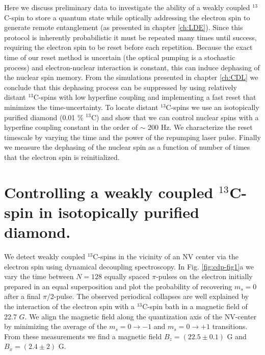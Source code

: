 Here we discuss preliminary data to investigate the ability of a weakly coupled $^{13}$C-spin to store a quantum state while optically addressing the electron spin to generate remote entanglement (as presented in chapter \ref{ch:LDE}). Since this protocol \cite{Barrett_Phys.Rev.A_2005,Bernien_Nature_2013} is inherently probabilistic it must be repeated many times until success, requiring the electron spin to be reset before each repetition. Because the exact time of our reset method is uncertain (the optical pumping is a stochastic process) and electron-nuclear interaction is constant, this can induce dephasing of the nuclear spin memory. From the simulations presented in chapter \ref{ch:CDL} we conclude that this dephasing process can be suppressed by using relatively distant $^{13}$C-spins with low hyperfine coupling and implementing a fast reset that minimizes the time-uncertainty. To locate distant $^{13}$C-spins we use an isotopically purified diamond (0.01 $\%$ $^{13}$C) and show that we can control nuclear spins with a hyperfine coupling constant in the order of $\sim$ 200 Hz. We characterize the reset timescale by varying the time and the power of the repumping laser pulse. Finally we measure the dephasing of the nuclear spin as a function of number of times that the electron spin is reinitialized.

\section{Controlling a weakly coupled $^{13}$C-spin in isotopically purified diamond.}

We detect weakly coupled $^{13}$C-spins in the vicinity of an NV center via the electron spin using dynamical decoupling spectroscopy\cite{Taminiau_Phys.Rev.Lett._2012,Zhao_NatNano_2012,Kolkowitz_Phys.Rev.Lett._2012}. In Fig. \ref{fig:cdp-fig1}a we vary the time between $N = 128$ equally spaced $\pi$-pulses on the electron initially prepared in an equal superposition and plot the probability of recovering $m_s = 0$ after a final $\pi$/2-pulse. The observed periodical collapses\cite{Childress_Science_2006} are well explained by the interaction of the electron spin with a $^{13}$C-spin bath in a magnetic field of 22.7 $G$. We align the magnetic field along the quantization axis of the NV-center by minimizing the average of the $m_s = 0 \rightarrow -1$ and $m_s = 0 \rightarrow +1$ transitions. From these measurements we find a magnetic field $B_z = (22.5 \pm 0.1) $ G and $B_x = (2.4 \pm 2) $ G.

